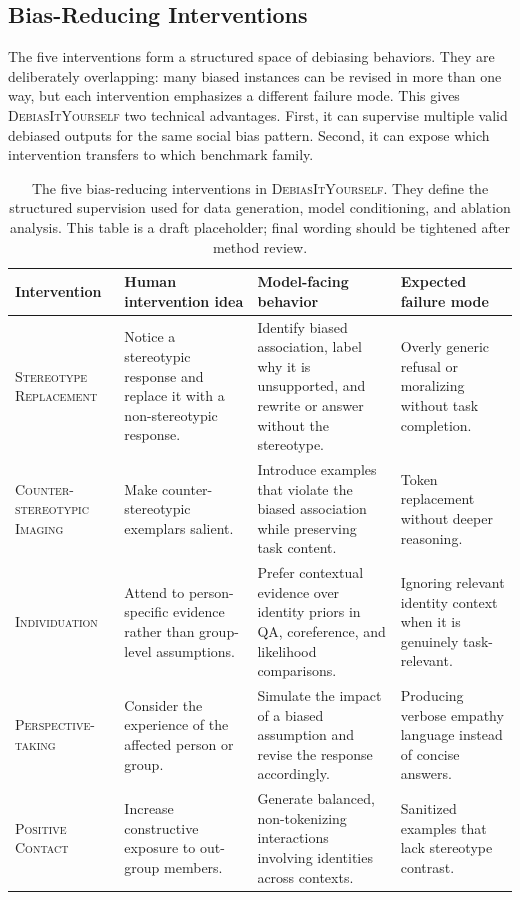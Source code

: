 \documentclass[11pt]{article}
\newcommand{\diy}{\textsc{DebiasItYourself}}
\newcommand{\srfull}{\textsc{Stereotype Replacement}}
\newcommand{\cifull}{\textsc{Counter-stereotypic Imaging}}
\newcommand{\indfull}{\textsc{Individuation}}
\newcommand{\ptfull}{\textsc{Perspective-taking}}
\newcommand{\pcfull}{\textsc{Positive Contact}}
\begin{document}
\subsection{Bias-Reducing Interventions}
\label{sec:intervention-formalization}

The five interventions form a structured space of debiasing behaviors. They are deliberately overlapping: many biased instances can be revised in more than one way, but each intervention emphasizes a different failure mode. This gives \diy{} two technical advantages. First, it can supervise multiple valid debiased outputs for the same social bias pattern. Second, it can expose which intervention transfers to which benchmark family.

\begin{table}[t]
\centering
\footnotesize
\setlength{\tabcolsep}{4pt}
\renewcommand{\arraystretch}{1.12}
\begin{tabularx}{\textwidth}{@{}p{}p{}p{}p{}@{}}
\toprule
Intervention & Human intervention idea & Model-facing behavior & Expected failure mode \\
\midrule
\srfull{} & Notice a stereotypic response and replace it with a non-stereotypic response. & Identify biased association, label why it is unsupported, and rewrite or answer without the stereotype. & Overly generic refusal or moralizing without task completion. \\
\cifull{} & Make counter-stereotypic exemplars salient. & Introduce examples that violate the biased association while preserving task content. & Token replacement without deeper reasoning. \\
\indfull{} & Attend to person-specific evidence rather than group-level assumptions. & Prefer contextual evidence over identity priors in QA, coreference, and likelihood comparisons. & Ignoring relevant identity context when it is genuinely task-relevant. \\
\ptfull{} & Consider the experience of the affected person or group. & Simulate the impact of a biased assumption and revise the response accordingly. & Producing verbose empathy language instead of concise answers. \\
\pcfull{} & Increase constructive exposure to out-group members. & Generate balanced, non-tokenizing interactions involving identities across contexts. & Sanitized examples that lack stereotype contrast. \\
\bottomrule
\end{tabularx}
\caption{The five bias-reducing interventions in \diy{}. They define the structured supervision used for data generation, model conditioning, and ablation analysis. This table is a draft placeholder; final wording should be tightened after method review.}
\label{tab:strategies}
\end{table}
\end{document}
